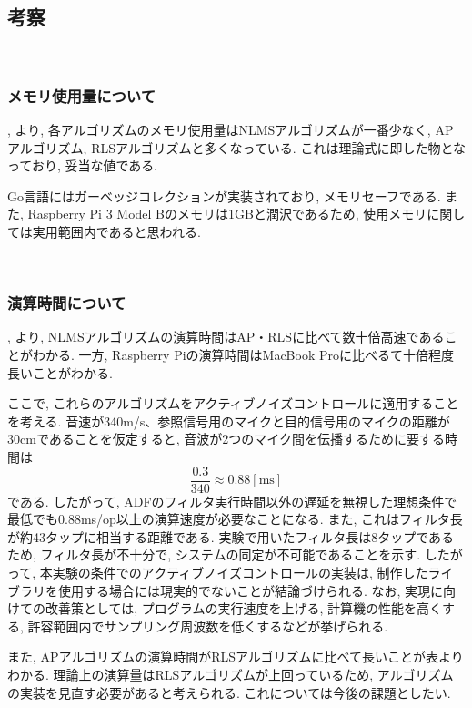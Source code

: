 \subsection{考察}\label{consideration-color}

\
\subsubsection{メモリ使用量について}\label{about-memory}

, より, 各アルゴリズムのメモリ使用量はNLMSアルゴリズムが一番少なく, APアルゴリズム, RLSアルゴリズムと多くなっている. これは理論式に即した物となっており, 妥当な値である. 

Go言語にはガーベッジコレクションが実装されており, メモリセーフである. また, Raspberry
Pi 3 Model
Bのメモリは1GBと潤沢であるため, 使用メモリに関しては実用範囲内であると思われる. 

\
\subsubsection{演算時間について}\label{about-time}

, より, NLMSアルゴリズムの演算時間はAP・RLSに比べて数十倍高速であることがわかる. 一方, Raspberry Piの演算時間はMacBook Proに比べるて十倍程度長いことがわかる. 

ここで, これらのアルゴリズムをアクティブノイズコントロールに適用することを考える. 
音速が340m/s、参照信号用のマイクと目的信号用のマイクの距離が30cmであることを仮定すると, 音波が2つのマイク間を伝播するために要する時間は
\begin{equation}
  \frac{0.3}{340} \approx 0.88 [\si{\milli \second}]
\end{equation}
である. したがって, ADFのフィルタ実行時間以外の遅延を無視した理想条件で最低でも0.88ms/op以上の演算速度が必要なことになる. 
また, これはフィルタ長が約43タップに相当する距離である. 実験で用いたフィルタ長は8タップであるため, フィルタ長が不十分で, システムの同定が不可能であることを示す. 
したがって, 本実験の条件でのアクティブノイズコントロールの実装は, 制作したライブラリを使用する場合には現実的でないことが結論づけられる. 
なお, 実現に向けての改善策としては, プログラムの実行速度を上げる, 計算機の性能を高くする, 許容範囲内でサンプリング周波数を低くするなどが挙げられる. 


また, APアルゴリズムの演算時間がRLSアルゴリズムに比べて長いことが表よりわかる. 理論上の演算量はRLSアルゴリズムが上回っているため, アルゴリズムの実装を見直す必要があると考えられる. これについては今後の課題としたい. 
